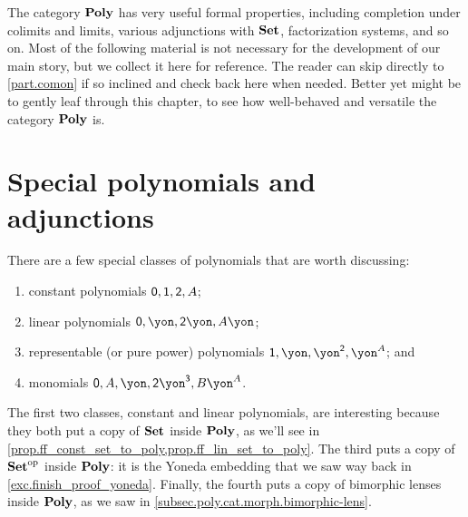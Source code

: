 \documentclass[Book-Poly]{subfiles}
\begin{document}
The category $\mathbf{Poly}$ has very useful formal properties, including completion under colimits and limits, various adjunctions with $\mathbf{Set}$, factorization systems, and so on. Most of the following material is not necessary for the development of our main story, but we collect it here for reference. The reader can skip directly to \cref{part.comon} if so inclined and check back here when needed. Better yet might be to gently leaf through this chapter, to see how well-behaved and versatile the category $\mathbf{Poly}$ is.

\section{Special polynomials and adjunctions} \label{sec.poly.bonus.adj}


There are a few special classes of polynomials that are worth discussing:
\begin{enumerate}[label=\alph*)]
	\item constant polynomials $\textsf{0},\textsf{1},\textsf{2},A$;
	\item linear polynomials $\0,\yon, \2\yon, A\yon$;
	\item representable (or pure power) polynomials $\1, \yon, \yon^\2, \yon^A$; and
	\item monomials $\0, A, \yon, \2\yon^\3, B\yon^A$.
\end{enumerate}
The first two classes, constant and linear polynomials, are interesting because they both put a copy of $\mathbf{Set}$ inside $\mathbf{Poly}$, as we'll see in \cref{prop.ff_const_set_to_poly,prop.ff_lin_set_to_poly}.
The third puts a copy of $\mathbf{Set}^{\textnormal{op}}$ inside $\mathbf{Poly}$: it is the Yoneda embedding that we saw way back in \cref{exc.finish_proof_yoneda}.
Finally, the fourth puts a copy of bimorphic lenses inside $\mathbf{Poly}$, as we saw in \cref{subsec.poly.cat.morph.bimorphic-lens}.

\end{document}
